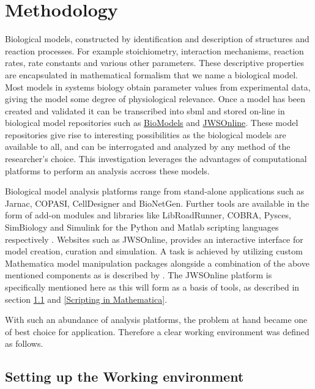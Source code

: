 \chapter{Methodology} \label{Methodology}
\label{chp:3}
Biological models, constructed by identification and description of structures and reaction processes. For example stoichiometry, interaction mechanisms, reaction rates, rate constants and various other parameters. These descriptive properties are encapsulated in mathematical formalism that we name a biological model. Most models in systems biology obtain parameter values from experimental data, giving the model some degree of physiological relevance. 
Once a model has been created and validated it can be transcribed into \gls{sbml} and stored on-line in biological model repositories such as \href{https://www.ebi.ac.uk/biomodels-main/}{BioModels} and \href{https://jjj.bio.vu.nl}{JWSOnline}. These model repositories give rise to interesting possibilities as the biological models are available to all, and can be interrogated and analyzed by any method of the researcher's choice. This investigation leverages the advantages of computational platforms to perform an analysis accross these models. 

Biological model analysis platforms range from stand-alone applications such as Jarnac, COPASI, CellDesigner and BioNetGen. Further tools are available in the form of add-on modules and libraries like LibRoadRunner, COBRA, Pysces, SimBiology and Simulink for the Python and Matlab scripting languages respectively \cite{Sauro2000, Hoops2006, Olivier2005, Somogyi2015, Harris2016, Laurent2017}. Websites such as JWSOnline, provides an interactive interface for model creation, curation and simulation. A task is achieved by utilizing custom Mathematica model manipulation packages alongside a combination of the above mentioned components as is described by \cite{Olivier2004, jwsdocs}. The JWSOnline platform is specifically mentioned here as this will form as a basis of tools, as described in section \ref{Working Environment} and \ref{Scripting in Mathematica}. 

With such an abundance of analysis platforms, the problem at hand became one of best choice for application. Therefore a clear working environment was defined as follows. 

\section{Setting up the Working environment} \label{Working Environment}

